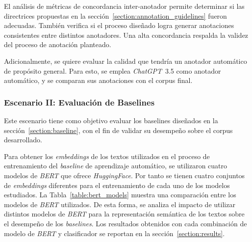 El an\'alisis de m\'etricas de concordancia inter-anotador permite determinar si las directrices propuestas en la 
secci\'on~\ref{section:annotation_guidelines} fueron adecuadas. Tambi\'en verifica si el proceso dise\~nado logra generar
anotaciones consistentes entre distintos anotadores. Una alta concordancia respalda la validez del proceso de anotaci\'on
planteado.

Adicionalmente, se quiere evaluar la calidad que tendr\'ia un anotador autom\'atico de prop\'osito general. Para esto, se 
emplea \emph{ChatGPT}~3.5 como anotador autom\'atico, y se comparan sus anotaciones con el corpus final.

\subsubsection{Escenario II: Evaluaci\'on de Baselines}
Este escenario tiene como objetivo evaluar los baselines dise\~nados en la secci\'on~\ref{section:baseline}, con el fin de 
validar su desempe\~no sobre el corpus desarrollado.

Para obtener los \emph{embeddings} de los textos utilizados en el proceso de entrenamiento del \emph{baseline} 
de aprendizaje autom\'atico, se utilizaron cuatro modelos de \emph{BERT} que ofrece \emph{HuggingFace}.
Por tanto se tienen cuatro conjuntos de \emph{embeddings} diferentes para el entrenamiento de cada uno de 
los modelos estudiados. La Tabla~\ref{table:bert_models} muestra una comparaci\'on entre los modelos de \emph{BERT} utilizados.
De esta forma, se analiza el impacto de utilizar distintos modelos de \emph{BERT} para la representaci\'on 
sem\'antica de los textos sobre el desempe\~no de los \emph{baselines}. Los resultados obtenidos con cada 
combinaci\'on de modelo de \emph{BERT} y clasificador se reportan en la secci\'on~\ref{section:results}.

\begin{table}[htpb]
    \centering
    \caption{Comparativa de modelos de \emph{BERT} utilizados.}
    \label{table:bert_models}
\end{table}

